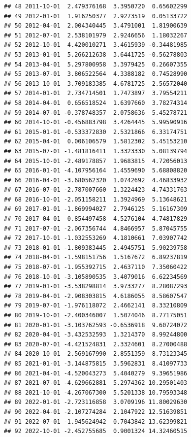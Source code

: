 \documentclass[
]{article}
\newenvironment{Shaded}{\begin{snugshade}}{\end{snugshade}}
\newcommand{\NormalTok}[1]{#1}
\newcommand{\SpecialCharTok}[1]{\textcolor[rgb]{0.00,0.00,0.00}{#1}}
\begin{document}
\begin{verbatim}
## 48 2011-10-01  2.479376168  3.3950720  0.65602299
## 49 2012-01-01  1.916250377  2.9273519  0.05133722
## 50 2012-04-01  2.004340445  3.4791001  1.81900639
## 51 2012-07-01  2.538101979  2.9246656  1.18032267
## 52 2012-10-01  4.420010271  3.4615939 -0.34481985
## 53 2013-01-01  5.266212638  3.6441725 -0.56278803
## 54 2013-04-01  5.297800958  3.3979425  0.26607355
## 55 2013-07-01  3.806522564  4.3388182  0.74528990
## 56 2013-10-01  3.709183385  4.6781725  2.56572040
## 57 2014-01-01  2.734714501  1.7473897  3.79554211
## 58 2014-04-01  0.656518524  1.6397660  3.78274314
## 59 2014-07-01 -0.378748357  2.0758636  5.45278721
## 60 2014-10-01 -0.456883798  3.4264445  5.99590916
## 61 2015-01-01 -0.533372830  2.5321866  6.33174751
## 62 2015-04-01  0.006106579  1.5812302  5.45153210
## 63 2015-07-01 -1.481816411  1.3323330  5.08139794
## 64 2015-10-01 -2.489178857  1.9683815  4.72056013
## 65 2016-01-01 -4.107956164  1.4559690  5.68808820
## 66 2016-04-01 -3.680562320  1.0742692  4.46833932
## 67 2016-07-01 -2.787007660  1.3224423  4.74331763
## 68 2016-10-01 -2.051158211  1.3924969  5.13648621
## 69 2017-01-01 -1.869994027  2.7946125  5.16167309
## 70 2017-04-01 -0.854497458  4.5276104  4.74817829
## 71 2017-07-01 -2.067356744  4.8466957  5.87045755
## 72 2017-10-01 -1.032553269  4.1810661  7.03907742
## 73 2018-01-01 -1.809383445  2.4945751  5.90239758
## 74 2018-04-01 -1.598151756  1.5167672  6.89237819
## 75 2018-07-01 -1.955392715  2.4637110  7.35060422
## 76 2018-10-01 -3.105890535  3.4079016  6.62234569
## 77 2019-01-01 -3.538298814  3.9733277  8.28087293
## 78 2019-04-01 -2.908303815  4.6186055  8.58607547
## 79 2019-07-01 -1.976118072  2.4662141  8.33210809
## 80 2019-10-01 -2.400346007  1.5074046  8.77175051
## 81 2020-01-01 -3.103762593 -0.6536918  9.60724072
## 82 2020-04-01 -3.432532593  1.3214370  8.99244800
## 83 2020-07-01 -4.421524831  2.3324601  8.27000488
## 84 2020-10-01 -2.569167990  2.8551359  8.73123345
## 85 2021-01-01 -3.144875815  3.5962831  8.41097733
## 86 2021-04-01 -4.520043273  5.4040279  9.39651986
## 87 2021-07-01 -4.629662881  5.2974362 10.29501403
## 88 2021-10-01 -4.267067300  5.5201338 10.79593348
## 89 2022-01-01 -2.723116858  3.0709196 11.80029630
## 90 2022-04-01 -2.107274284  2.1047922 12.51639851
## 91 2022-07-01 -1.945624942  0.7043842 13.62399821
## 92 2022-10-01 -2.452755685  0.9001324 14.32460515
\end{verbatim}

\begin{Shaded}
\end{Shaded}
\end{document}
